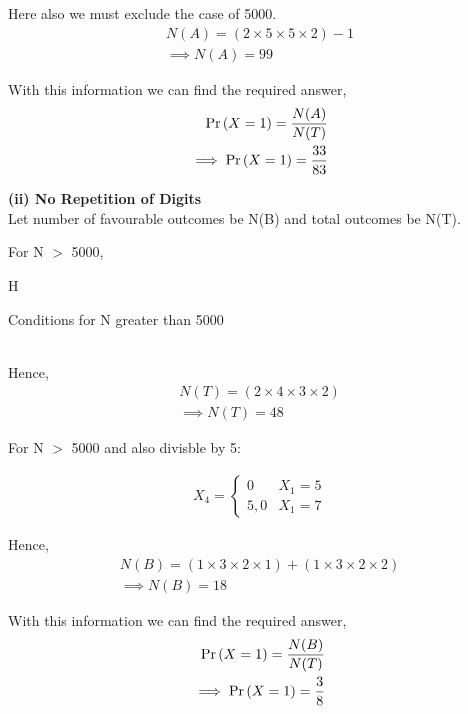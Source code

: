 \documentclass{article}
\begin{document}
Here also we must exclude the case of 5000.
\begin{align}
	N(A)=(2\times5\times5\times2)-1 \\
	\implies N(A)=99
\end{align}

With this information we can find the required answer,
\begin{align}
	\Pr\left(X=1\right)=\frac{N(A)}{N(T)}\\
	\implies \Pr\left(X=1\right)=\frac{33}{83}
\end{align}



\textbf{(ii) No Repetition of Digits}\\
Let number of favourable outcomes be N(B) and total outcomes be N(T).

For N $>$ 5000,

H\begin{table}[h]
    \centering
    
    \caption{Conditions for N greater than 5000}
    \label{table_4}
    \end{table}
\\
Hence,
\begin{align}
	N(T)=(2\times4\times3\times2) \\
	\implies N(T)=48
\end{align}

For N $>$ 5000 and also divisble by 5:

\begin{align}
	X_{4} = \begin{cases}
		0 & X_{1}=5 \\
		5,0 & X_{1}=7
	\end{cases}
\end{align}

Hence,
\begin{align}
	N(B)=(1\times3\times2\times1)+(1\times3\times2\times2) \\
	\implies N(B)=18
\end{align}

With this information we can find the required answer,
\begin{align}
	\Pr\left(X=1\right)=\frac{N(B)}{N(T)}\\
	\implies \Pr\left(X=1\right)=\frac{3}{8}
\end{align}
\end{document}
